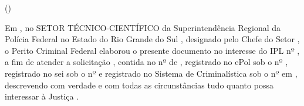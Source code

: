 \noindent\textbf{\MakeUppercase{\pfdocnamenum}}

\begin{center}
	\bigskip
	\textbf{\MakeUppercase{\pfdoctitle}}
	
	\ifx\pfdocsubtitle\empty
	\else
		(\MakeUppercase{\pfdocsubtitle})
	\fi
\end{center}

\bigskip

Em \pfdocdate\space
\unskip,
no SETOR TÉCNICO-CIENTÍFICO 
da Superintendência Regional da Polícia Federal 
no Estado do Rio Grande do Sul
\unskip,
designado pelo Chefe do Setor
\unskip,
o Perito Criminal Federal \MakeUppercase{\pfauthor}\space 
elaborou o presente documento
\ifx\pfipl\empty\else
no interesse do IPL nº \pfipl\space
\fi
\unskip,
a fim de atender a solicitação \pfclient\space
\unskip,
contida no \pfexptype\space nº \pfexpnum\space de \pfexpdate\space
\ifx\pfepol\empty\else
\unskip,
registrado no ePol sob o nº \pfepol\space
\fi
\ifx\pfsei\empty\else
\unskip,
registrado no sei sob o nº \pfsei\space
\fi
\space e 
registrado no Sistema de Criminalística sob o nº \pfregnum\space em \pfregdate\space
\unskip,
descrevendo com verdade e com todas as circunstâncias tudo quanto possa interessar à Justiça
\unskip.

